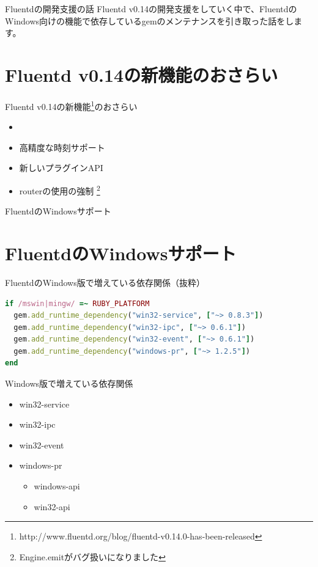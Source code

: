 \documentclass[12pt, unicode]{beamer}
\begin{document}
\begin{frame}{Fluentdの開発支援の話}
  \Large{Fluentd v0.14の開発支援をしていく中で、FluentdのWindows向けの機能で依存しているgemのメンテナンスを引き取った話をします。}
\end{frame}

\section[]{Fluentd v0.14の新機能のおさらい}
\begin{frame}{Fluentd v0.14の新機能\footnote[frame]{http://www.fluentd.org/blog/fluentd-v0.14.0-has-been-released}のおさらい}
  \Large{
    \begin{itemize}
    \item {}
    \item 高精度な時刻サポート
    \item 新しいプラグインAPI
    \item routerの使用の強制 \footnote[frame]{Engine.emitがバグ扱いになりました}
    \end{itemize}
  }
\end{frame}

\begin{frame}{FluentdのWindowsサポート}
  \Large{
  }
\end{frame}

\newcommand\Small{\fontsize{9}{9.5}\selectfont}
\section[]{FluentdのWindowsサポート}
\begin{frame}[fragile]{FluentdのWindows版で増えている依存関係（抜粋）}
\begin{lstlisting}[language=Ruby,basicstyle=\ttfamily\Small]
if /mswin|mingw/ =~ RUBY_PLATFORM
  gem.add_runtime_dependency("win32-service", ["~> 0.8.3"])
  gem.add_runtime_dependency("win32-ipc", ["~> 0.6.1"])
  gem.add_runtime_dependency("win32-event", ["~> 0.6.1"])
  gem.add_runtime_dependency("windows-pr", ["~> 1.2.5"])
end
  \end{lstlisting}
\end{frame}

\begin{frame}{Windows版で増えている依存関係}
  \Large{
    \begin{itemize}
    \item win32-service
    \item win32-ipc
    \item win32-event
    \item windows-pr
      \begin{itemize}
      \item windows-api
      \item win32-api
      \end{itemize}
    \end{itemize}
  }
\end{frame}
\end{document}
